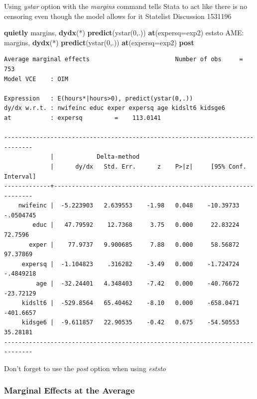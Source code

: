 \documentclass[
]{book}
\newenvironment{Shaded}{\begin{snugshade}}{\end{snugshade}}
\newcommand{\FunctionTok}[1]{\textcolor[rgb]{0.13,0.29,0.53}{\textbf{#1}}}
\newcommand{\KeywordTok}[1]{\textcolor[rgb]{0.13,0.29,0.53}{\textbf{#1}}}
\newcommand{\NormalTok}[1]{#1}
\newcommand{\OtherTok}[1]{\textcolor[rgb]{0.56,0.35,0.01}{#1}}
\begin{document}
Using \emph{ystar} option with the \emph{margins} command tells Stata to act like there is no censoring even though the model allows for it
Statelist Discussion 1531196

\begin{Shaded}
\begin{Highlighting}[]
\KeywordTok{quietly}\NormalTok{ margins, }\KeywordTok{dydx}\NormalTok{(*) }\KeywordTok{predict}\NormalTok{(ystar(0,.)) }\FunctionTok{at}\NormalTok{(expersq=}\OtherTok{\textasciigrave{}exp2\textquotesingle{}}\NormalTok{)}
\NormalTok{eststo AME: margins, }\KeywordTok{dydx}\NormalTok{(*) }\KeywordTok{predict}\NormalTok{(ystar(0,.)) }\FunctionTok{at}\NormalTok{(expersq=}\OtherTok{\textasciigrave{}exp2\textquotesingle{}}\NormalTok{) }\KeywordTok{post}
\end{Highlighting}
\end{Shaded}

\begin{verbatim}
Average marginal effects                        Number of obs     =        753
Model VCE    : OIM

Expression   : E(hours*|hours>0), predict(ystar(0,.))
dy/dx w.r.t. : nwifeinc educ exper expersq age kidslt6 kidsge6
at           : expersq         =    113.0141

------------------------------------------------------------------------------
             |            Delta-method
             |      dy/dx   Std. Err.      z    P>|z|     [95% Conf. Interval]
-------------+----------------------------------------------------------------
    nwifeinc |  -5.223903   2.639553    -1.98   0.048    -10.39733   -.0504745
        educ |   47.79592    12.7368     3.75   0.000     22.83224     72.7596
       exper |    77.9737   9.900685     7.88   0.000     58.56872    97.37869
     expersq |  -1.104823    .316282    -3.49   0.000    -1.724724   -.4849218
         age |  -32.24401   4.348403    -7.42   0.000    -40.76672   -23.72129
     kidslt6 |  -529.8564   65.40462    -8.10   0.000    -658.0471   -401.6657
     kidsge6 |  -9.611857   22.90535    -0.42   0.675    -54.50553    35.28181
------------------------------------------------------------------------------
\end{verbatim}

Don't forget to use the \emph{post} option when using \emph{eststo}

\subsubsection*{Marginal Effects at the Average}\label{marginal-effects-at-the-average}
\end{document}
